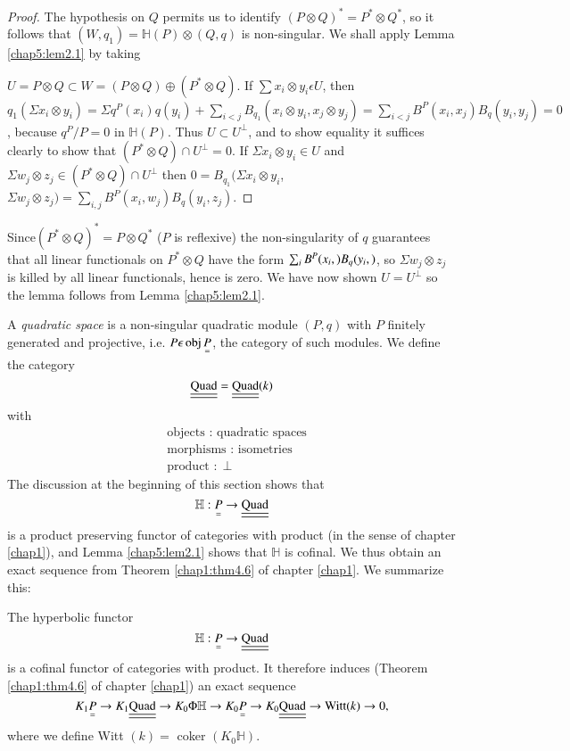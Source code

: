 \begin{proof}
The hypothesis on $Q$ permits us to identify $(P \otimes Q)^\ast = P^\ast
\otimes Q^\ast$, so it follows that $(W, q_1) = \mathbb{H} (P) \otimes
(Q, q)$ is non-singular. We shall apply Lemma \ref{chap5:lem2.1} by taking 

$U = P \otimes Q \subset W = (P \otimes Q) \oplus (P^\ast \otimes Q)$. If
$\sum x_i \otimes y_i \epsilon U$, then $q_1 (\Sigma x_i \otimes y_i)
= \Sigma q^P (x_i) q (y_i) + \sum_{i < j} B_{q_1} (x_i \otimes y_i,
x_j \otimes y_j) = \sum_{i < j} B^P (x_i, x_j) B_q (y_i, y_j) =0$,
because $q^P/P =0$ in $\mathbb{H}(P)$. Thus $U \subset U^\perp$, and
to show equality it suffices clearly to show that  
$(P^* \otimes Q) \cap U^\perp = 0$. If $\Sigma x_i  \otimes y_i 
\in U$ and $\Sigma w_j \otimes z_j \in (P^* \otimes Q) \cap
U^\perp$ then $0 = B_{q_1} ( \Sigma x_i \otimes y_i$, $ \Sigma w_j \otimes z_j)
= \sum \limits_{i, j} B^P (x_i, w_j) B_q (y_i, z_j)$. 
\end{proof}

Since\pageoriginale $(P^\ast \otimes Q)^\ast = P \otimes Q^\ast$ ($P$
is reflexive) the 
non-singularity of $q$ guarantees that all linear functionals on $P^\ast
\otimes Q$ have the form $\sum_i B^P(x_i, )\break B_q (y_i, )$, so $\Sigma
w_j \otimes z_j$ is killed by all linear functionals, hence is
zero. We have now shown $U = U^\perp$ so the lemma follows from Lemma
\ref{chap5:lem2.1}. 

A \textit{quadratic space} is a non-singular quadratic module $(P, q)$
with $P$ finitely generated and projective, i.e. $P \epsilon \operatorname{obj}
\underset{=}P$, the category of such modules. We define the category 
$$
\underline{\underline{\rm Quad}} = \underline{\underline{\rm Quad}} (k)
$$
with
\begin{align*}
& \text{ objects } : \text{ quadratic spaces } \\
& \text{ morphisms } : \text{ isometries } \\
& \text{ product } : \perp 
\end{align*}
The discussion at the beginning of this section shows that
$$
\mathbb{H} : \underset{=}P \to \underline{\underline{\rm Quad}}
$$
is a product preserving functor of categories with product (in the
sense of chapter \ref{chap1}), and Lemma \ref{chap5:lem2.1} shows that
$\mathbb{H}$ is 
cofinal. We thus obtain an exact sequence from Theorem
\ref{chap1:thm4.6} of chapter \ref{chap1}. We summarize this: 

\setcounter{prop}{3}
\begin{prop}%
 The hyperbolic functor
$$
\mathbb{H} : \underset{=}P \to \underline{\underline{\rm Quad}}
$$
is a cofinal functor of categories with product. It therefore
  induces (Theorem \ref{chap1:thm4.6} of chapter \ref{chap1}) an exact
  sequence  
$$
K_1 \underset{=}P \to K_1 \underline{\underline{\rm Quad}} \to K_0
\Phi \mathbb{H} \to K_0 \underset{=}P \to K_0
\underline{\underline{\rm Quad}} \to {\rm Witt}(k) \to 0, 
$$
where we define Witt $(k) =$ coker $(K_0 \mathbb{H})$.
\end{prop}

